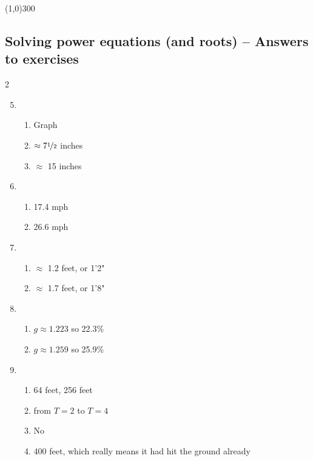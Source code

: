 \begin{center}
\line(1,0){300} %
\end{center}

\subsection {Solving power equations (and roots) -- Answers to exercises} %

\begin{multicols} {2}
\begin{enumerate}
\setcounter{enumi}{4}

\item %
\begin{enumerate}
\item Graph
\item $\approx 7\nicefrac{1}{2}$ inches
\item $\approx$ 15 inches
\end{enumerate}

\item %
\begin{enumerate}
\item 17.4 mph
\item 26.6 mph
\end{enumerate}

\item %
\begin{enumerate}
\item $\approx$ 1.2 feet, or 1'2"
\item $\approx$ 1.7 feet, or 1'8"
\end{enumerate}

\item %
\begin{enumerate}
\item $g \approx 1.223$ so 22.3\%
\item $g \approx 1.259$ so 25.9\%
\end{enumerate}

\item %
\begin{enumerate}
\item 64 feet, 256 feet
\item from $T=2$ to $T=4$
\item No
\item 400 feet, which really means it had hit the ground already
\end{enumerate}


\end{enumerate}
\end{multicols}
